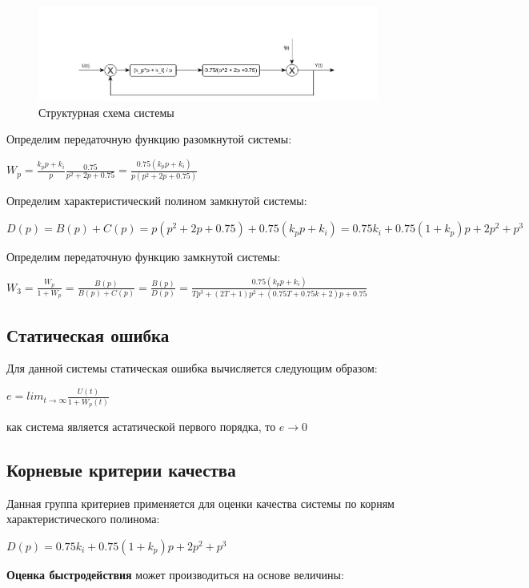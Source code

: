 \begin{figure}[h!]
	\centering
	\includegraphics[scale = 0.55]{images/w.png}
	\caption{Структурная схема системы}
	\label{image:1}
\end{figure}

\FloatBarrier
Определим передаточную функцию разомкнутой системы:

$W_p=\frac{k_pp+k_i}{p}\frac{0.75}{p^2 + 2p + 0.75}  =\frac{0.75(k_pp+k_i)}{p(p^2 + 2p + 0.75)}$

Определим характеристический полином замкнутой системы:

$D(p)=B(p)+C(p)=p(p^2 + 2p + 0.75)+0.75(k_pp+k_i)=0.75k_i + 0.75(1 + k_p)p + 2p^2 + p^3$

Определим передаточную функцию замкнутой системы:

$W_3=\frac{W_p}{1 + W_p}=\frac{B(p)}{B(p)+C(p)}=\frac{B(p)}{D(p)}=\frac{0.75(k_pp+k_i)}{Tp^3+(2T+1)p^2+(0.75T+0.75k+2)p+0.75} 
$



\subsection{Статическая ошибка}

Для данной системы статическая ошибка вычисляется следующим образом:


$e=lim_{t\rightarrow\infty}\frac{U(t)}{1+W_p(t)}$

 как система является астатической первого порядка, то $e \rightarrow 0$

\subsection{Корневые критерии качества}

Данная группа критериев применяется для оценки качества системы по корням характеристического полинома:



$D(p)=0.75k_i + 0.75(1 + k_p)p + 2p^2 + p^3$


\textbf{Оценка быстродействия} может производиться на основе величины:


